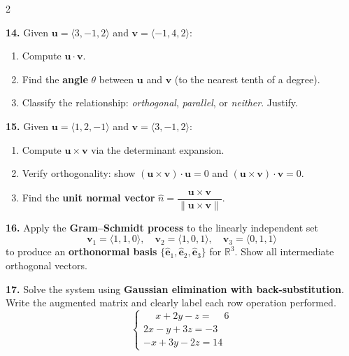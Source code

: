 \documentclass[a4paper,10pt]{article}
\begin{document}
\begin{multicols}{2}
    \medskip

    \textbf{14.} Given $\mathbf{u}=\langle 3,-1,2\rangle$ and $\mathbf{v}=\langle -1,4,2\rangle$:
    \begin{enumerate}[label=(\alph*)]
        \item Compute $\mathbf{u}\cdot\mathbf{v}$.
        \item Find the \textbf{angle} $\theta$ between $\mathbf{u}$ and $\mathbf{v}$ (to the nearest tenth of a degree).
        \item Classify the relationship: \textit{orthogonal}, \textit{parallel}, or \textit{neither}. Justify.
    \end{enumerate}

    \medskip

    \textbf{15.} Given $\mathbf{u}=\langle 1,2,-1\rangle$ and $\mathbf{v}=\langle 3,-1,2\rangle$:
    \begin{enumerate}[label=(\alph*)]
        \item Compute $\mathbf{u}\times\mathbf{v}$ via the determinant expansion.
        \item Verify orthogonality: show $(\mathbf{u}\times\mathbf{v})\cdot\mathbf{u}=0$ and $(\mathbf{u}\times\mathbf{v})\cdot\mathbf{v}=0$.
        \item Find the \textbf{unit normal vector} $\hat{n}=\dfrac{\mathbf{u}\times\mathbf{v}}{\|\mathbf{u}\times\mathbf{v}\|}$.
    \end{enumerate}

    \medskip

    \textbf{16.} Apply the \textbf{Gram--Schmidt process} to the linearly independent set
    \[
        \mathbf{v}_1=\langle 1,1,0\rangle,\quad
        \mathbf{v}_2=\langle 1,0,1\rangle,\quad
        \mathbf{v}_3=\langle 0,1,1\rangle
    \]
    to produce an \textbf{orthonormal basis} $\{\hat{\mathbf{e}}_1, \hat{\mathbf{e}}_2, \hat{\mathbf{e}}_3\}$ for $\mathbb{R}^{3}$. Show all intermediate orthogonal vectors.

    \vspace{3pt}

    \textbf{17.} Solve the system using \textbf{Gaussian elimination with back-substitution}. Write the augmented matrix and clearly label each row operation performed.
    \[
        \begin{cases}
            \phantom{-}x + 2y - z = \phantom{-}6 \\
            2x - y + 3z = -3                     \\
            -x + 3y - 2z = 14
        \end{cases}
    \]


\end{multicols}
\end{document}

